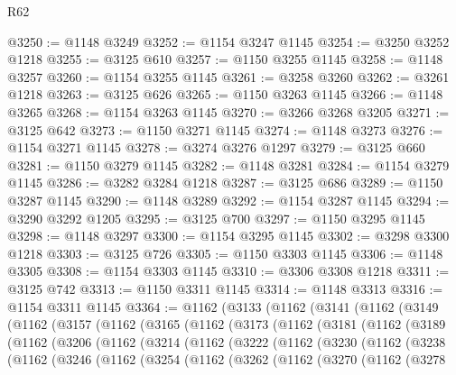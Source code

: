 \begin{lexlean}{R62}
\begin{coremodule}
@3250 := @1148 @3249
@3252 := @1154 @3247 @1145
@3254 := @3250 @3252 @1218
@3255 := @3125 @610
@3257 := @1150 @3255 @1145
@3258 := @1148 @3257
@3260 := @1154 @3255 @1145
@3261 := @3258 @3260
@3262 := @3261 @1218
@3263 := @3125 @626
@3265 := @1150 @3263 @1145
@3266 := @1148 @3265
@3268 := @1154 @3263 @1145
@3270 := @3266 @3268 @3205
@3271 := @3125 @642
@3273 := @1150 @3271 @1145
@3274 := @1148 @3273
@3276 := @1154 @3271 @1145
@3278 := @3274 @3276 @1297
@3279 := @3125 @660
@3281 := @1150 @3279 @1145
@3282 := @1148 @3281
@3284 := @1154 @3279 @1145
@3286 := @3282 @3284 @1218
@3287 := @3125 @686
@3289 := @1150 @3287 @1145
@3290 := @1148 @3289
@3292 := @1154 @3287 @1145
@3294 := @3290 @3292 @1205
@3295 := @3125 @700
@3297 := @1150 @3295 @1145
@3298 := @1148 @3297
@3300 := @1154 @3295 @1145
@3302 := @3298 @3300 @1218
@3303 := @3125 @726
@3305 := @1150 @3303 @1145
@3306 := @1148 @3305
@3308 := @1154 @3303 @1145
@3310 := @3306 @3308 @1218
@3311 := @3125 @742
@3313 := @1150 @3311 @1145
@3314 := @1148 @3313
@3316 := @1154 @3311 @1145
@3364 := @1162
    (@3133
      (@1162
        (@3141
          (@1162
            (@3149
              (@1162
                (@3157
                  (@1162
                    (@3165
                      (@1162
                        (@3173
                          (@1162
                            (@3181
                              (@1162
                                (@3189
                                  (@1162
                                    (@3206
                                      (@1162
                                        (@3214
                                          (@1162
                                            (@3222
                                              (@1162
                                                (@3230
                                                  (@1162
                                                    (@3238
                                                      (@1162
                                                        (@3246
                                                          (@1162
                                                            (@3254
                                                              (@1162
                                                                (@3262
                                                                  (@1162
                                                                    (@3270
                                                                      (@1162
                                                                        (@3278

\end{coremodule}
\end{lexlean}
